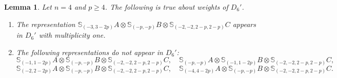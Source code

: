 \documentclass[11pt,reqno]{amsart}
\newcommand{\oo}{\otimes}
\newcommand{\bS}{\mathbb{S}}
\newtheorem{lemma}[theorem]{Lemma}
\numberwithin{equation}{section}
\begin{document}
\begin{lemma}\label{lem:witD_6primen4}
Let $n=4$ and $p\geq 4$. The following is true about weights of $D_6'$.
\begin{enumerate}
\item The representation $\bS_{(-3,3-2p)}A\oo \bS_{(-p,-p)}B\oo \bS_{(-2,-2,2-p,2-p)}C$ appears in $D_6'$ with multiplicity one.
\item The following representations do not appear in $D_6'$:
$$
\bS_{(-1,1-2p)}A\oo \bS_{(-p,-p)}B\oo \bS_{(-2,-2,2-p,2-p)}C,\quad \bS_{(-p,-p)}A\oo \bS_{(-1,1-2p)}B\oo \bS_{(-2,-2,2-p,2-p)}C,
$$ 
$$
\bS_{(-2,2-2p)}A\oo \bS_{(-p,-p)}B\oo \bS_{(-2,-2,2-p,2-p)}C,\quad \bS_{(-4,4-2p)}A\oo \bS_{(-p,-p)}B\oo \bS_{(-2,-2,2-p,2-p)}C.
$$
\end{enumerate}


	
\end{lemma}
\end{document}
